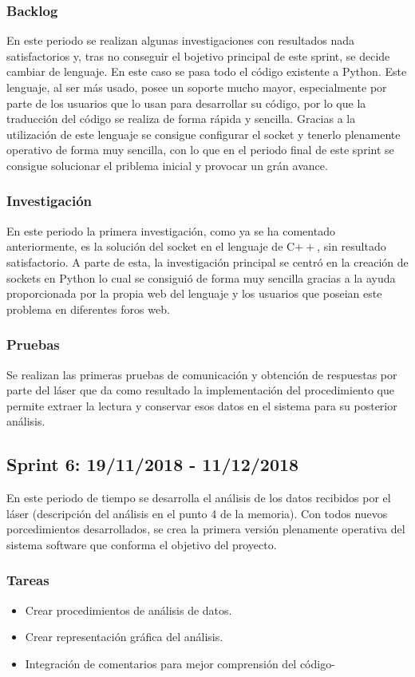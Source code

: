 \subsubsection{Backlog}
En este periodo se realizan algunas investigaciones con resultados nada satisfactorios y, tras no conseguir el bojetivo principal de este sprint, se decide cambiar de lenguaje. En este caso se pasa todo el código existente a Python. Este lenguaje, al ser más usado, posee un soporte mucho mayor, especialmente por parte de los usuarios que lo usan para desarrollar su código, por lo que la traducción del código se realiza de forma rápida y sencilla. Gracias a la utilización de este lenguaje se consigue configurar el socket y tenerlo plenamente operativo de forma muy sencilla, con lo que en el periodo final de este sprint se consigue solucionar el priblema inicial y provocar un grán avance.
\subsubsection{Investigación}
En este periodo la primera investigación, como ya se ha comentado anteriormente, es la solución del socket en el lenguaje de C$++$, sin resultado satisfactorio. A parte de esta, la investigación principal se centró en la creación de sockets en Python lo cual se consiguió de forma muy sencilla gracias a la ayuda proporcionada por la propia web del lenguaje y los usuarios que poseian este problema en diferentes foros web.
\subsubsection{Pruebas}
Se realizan las primeras pruebas de comunicación y obtención de respuestas por parte del láser que da como resultado la implementación del procedimiento que permite extraer la lectura y conservar esos datos en el sistema para su posterior análisis.

\subsection{Sprint 6: 19/11/2018 - 11/12/2018}
En este periodo de tiempo se desarrolla el análisis de los datos recibidos por el láser (descripción del análisis en el punto 4 de la memoria). Con todos nuevos porcedimientos desarrollados, se crea la primera versión plenamente operativa del sistema software que conforma el objetivo del proyecto.
\subsubsection{Tareas}
\begin{itemize}
	\item Crear procedimientos de análisis de datos.
	\item Crear representación gráfica del análisis.
	\item Integración de comentarios para mejor comprensión del código-
\end{itemize}
